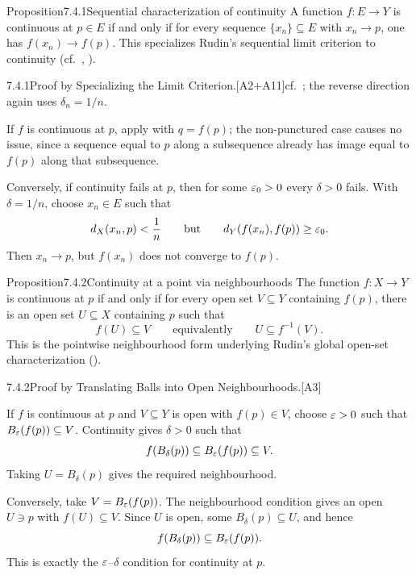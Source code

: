 \documentclass[main.tex]{subfiles}
\begin{document}

\begin{Obj}{Proposition}{7.4.1}{Sequential characterization of continuity}
A function $f:E\to Y$ is continuous at $p\in E$ if and only if for every sequence
$\{x_n\}\subseteq E$ with $x_n\to p$, one has $f(x_n)\to f(p)$.
This specializes Rudin's sequential limit criterion to continuity (cf.\ , ).
\end{Obj}
\begin{Prf}{7.4.1}{Proof by Specializing the Limit Criterion.}{[A2$+$A11]\quad cf.\ ; the reverse direction again uses $\delta_n=1/n$.}
\item If $f$ is continuous at $p$, apply  with $q=f(p)$; the non-punctured case causes
  no issue, since a sequence equal to $p$ along a subsequence already has image equal to $f(p)$
  along that subsequence.
\item Conversely, if continuity fails at $p$, then for some $\varepsilon_0>0$ every $\delta>0$ fails.
  With $\delta=1/n$, choose $x_n\in E$ such that
  \[
    d_X(x_n,p)<\frac1n
    \qquad\text{but}\qquad
    d_Y(f(x_n),f(p))\ge\varepsilon_0 .
  \]
  Then $x_n\to p$, but $f(x_n)$ does not converge to $f(p)$.
\end{Prf}

\begin{Obj}{Proposition}{7.4.2}{Continuity at a point via neighbourhoods}
The function $f:X\to Y$ is continuous at $p$ if and only if for every open set
$V\subseteq Y$ containing $f(p)$, there is an open set $U\subseteq X$ containing $p$ such that
\[
  f(U)\subseteq V
  \qquad\text{equivalently}\qquad
  U\subseteq f^{-1}(V).
\]
This is the pointwise neighbourhood form underlying Rudin's global open-set characterization
().
\end{Obj}
\begin{Prf}{7.4.2}{Proof by Translating Balls into Open Neighbourhoods.}{[A3]}
\item If $f$ is continuous at $p$ and $V\subseteq Y$ is open with $f(p)\in V$, choose
  $\varepsilon>0$ such that $B_\varepsilon(f(p))\subseteq V$. Continuity gives $\delta>0$ such that
  \[
    f(B_\delta(p))\subseteq B_\varepsilon(f(p))\subseteq V.
  \]
  Taking $U=B_\delta(p)$ gives the required neighbourhood.
\item Conversely, take $V=B_\varepsilon(f(p))$. The neighbourhood condition gives an open
  $U\ni p$ with $f(U)\subseteq V$. Since $U$ is open, some $B_\delta(p)\subseteq U$, and hence
  \[
    f(B_\delta(p))\subseteq B_\varepsilon(f(p)).
  \]
  This is exactly the $\varepsilon$--$\delta$ condition for continuity at $p$.
\end{Prf}
\end{document}
